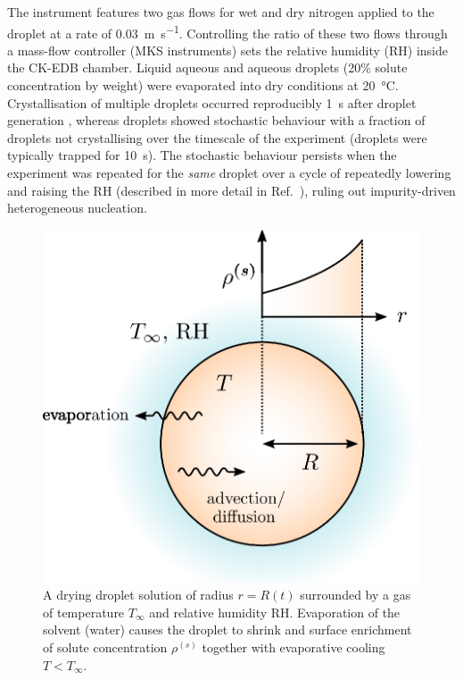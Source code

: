 \documentclass[11pt,twoside]{report}
\begin{document}
The instrument features two gas flows for wet and dry nitrogen applied to the droplet at a rate of \SI{0.03}{\metre\per\second}.
Controlling the ratio of these two flows through a mass-flow controller (MKS instruments) sets the relative humidity (RH) inside the CK-EDB chamber.
Liquid aqueous  and aqueous  droplets (20\% solute concentration by weight) were evaporated into dry conditions at \SI{20}{\celsius}.
Crystallisation of multiple  droplets occurred reproducibly \SI{1}{\second} after droplet generation \cite{GregsonJPCB2019}, whereas  droplets showed stochastic behaviour with a fraction of droplets not crystallising over the timescale of the experiment (droplets were typically trapped for \SI{10}{\second}).
The stochastic behaviour persists when the experiment was repeated for the \emph{same}  droplet over a cycle of repeatedly lowering and raising the RH (described in more detail in Ref.\ \cite{GregsonTBD2019}), ruling out impurity-driven heterogeneous nucleation.

\begin{figure}
  \includegraphics[width=0.75\linewidth,outer]{aerosol-droplet}
  \caption[Model drying aerosol droplet]{
    A drying droplet solution of radius $r=R(t)$ surrounded by a gas of temperature $T_\infty$ and relative humidity RH.
    Evaporation of the solvent (water) causes the droplet to shrink and surface enrichment of solute concentration $\rho^{(s)}$ together with evaporative cooling $T < T_\infty$.}
  \label{fig:aerosol-droplet}
\end{figure}
\end{document}

